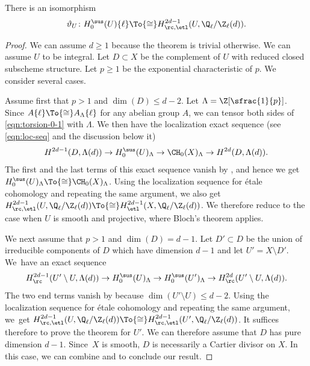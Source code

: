 \begin{thm}\label{thm:torsion-0}
There is an isomorphism
\begin{equation}\label{eqn:torsion-0-1}
\vartheta_U \colon
H^{\sus}_0(U)\{\ell\} \To{\cong} H^{2d-1}_{\rc, \etl}(U, {\Q_\ell}/{\Z_\ell}(d)).
\end{equation}
\end{thm}
\begin{proof}
We can assume $d \ge 1$ because the theorem is trivial otherwise.
We can assume $U$ to be integral.
Let $D \subset X$ be the complement of $U$ with reduced closed subscheme structure.
Let $p \ge 1$ be the exponential characteristic of $p$.
We consider several cases.

Assume first that $p > 1$ and $\dim(D) \le d-2$.
Let $\Lambda = \Z[\sfrac{1}{p}]$.
Since $A\{\ell\} \To{\cong} A_\Lambda\{\ell\}$ for any abelian
group $A$,
we can tensor both sides of \eqref{eqn:torsion-0-1} with $\Lambda$.
We then have the localization exact sequence (see \eqref{eqn:loc-seq} and
the discussion below it)
\[
H^{2d-1}(D, \Lambda(d)) \to H^{\sus}_0(U)_\Lambda \to \CH_0(X)_\Lambda \to
H^{2d}(D, \Lambda(d)).
\]
The first and the last terms of this exact sequence vanish by \cite[Th.\,5.1]{KP},
and hence we get $H^{\sus}_0(U)_\Lambda \To{\cong} \CH_0(X)_\Lambda$.
Using the localization sequence for étale cohomology and repeating
the same argument, we also get
$H^{2d-1}_{\rc, \etl}(U, {\Q_\ell}/{\Z_\ell}(d)) \To{\cong}
H^{2d-1}_{\etl}(X, {\Q_\ell}/{\Z_\ell}(d))$. We therefore reduce to the case
when $U$ is smooth and projective, where Bloch's theorem applies.

We next assume that $p > 1$ and $\dim(D) = d-1$.
Let $D' \subset D$ be the union of irreducible components of $D$ which have
dimension $d-1$ and let $U' = X \setminus D'$.
We~have an exact sequence
\[
H^{2d-1}_\rc(U' \setminus U, \Lambda(d)) \to H^{\sus}_0(U)_\Lambda \to
H^{\sus}_0(U')_\Lambda \to H^{2d}_\rc(U' \setminus U, \Lambda(d)).
\]
The two end terms vanish by \cite[Lem.\,6.2]{KP-1} because $\dim(U' \setminus U)
\le d-2$. Using the localization sequence for étale cohomology and repeating
the same argument, we~get
$H^{2d-1}_{\rc, \etl}(U, {\Q_\ell}/{\Z_\ell}(d)) \To{\cong}
H^{2d-1}_{\rc, \etl}(U', {\Q_\ell}/{\Z_\ell}(d))$. It suffices therefore to prove the
theorem for $U'$. We can therefore assume that $D$ has pure dimension $d-1$.
Since~$X$ is smooth, $D$ is necessarily a Cartier divisor on $X$.
In this case, we can combine  and
\cite[Th.\,1.1]{Krishna-2} to conclude our result.


\end{proof}
